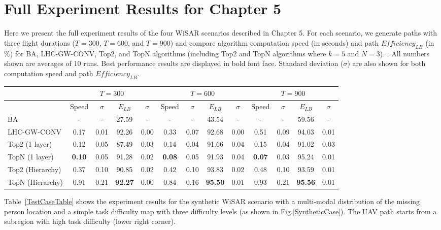 \chapter{Full Experiment Results for Chapter 5}
\label{chap:result}

Here we present the full experiment results of the four WiSAR scenarios described in Chapter 5. For each scenario, we generate paths with three flight durations ($T=300$, $T=600$, and $T=900$) and compare algorithm computation speed (in seconds) and path $\mathit{Efficiency_{LB}}$ (in \%) for BA, LHC-GW-CONV, Top2, and TopN algorithms (including Top2 and TopN algorithms where $k=5$ and $N=3$). . All numbers shown are averages of 10 runs. Best performance results are displayed in bold font face. Standard deviation ($\sigma$) are also shown for both computation speed and path $\mathit{Efficiency_{LB}}$.

\begin{center}
\begin{table*}
{
\scriptsize
\hfill{}
\setlength{\extrarowheight}{1.5pt}
\begin{tabular}
{|l|c|c|c|c|c|c|c|c|c|c|c|c|}
\hline
& \multicolumn{4}{|c|}{$T=300$} & \multicolumn{4}{|c|}{$T=600$} & \multicolumn{4}{|c|}{$T=900$} \\ 
\hline
& Speed & $\sigma$ & $\mathit{E_{LB}}$ & $\sigma$ & Speed & $\sigma$ & $\mathit{E_{LB}}$ & $\sigma$ & Speed & $\sigma$ & $\mathit{E_{LB}}$ & $\sigma$\\ 
\hline
BA & - & - & 27.59 & - & - & - & 43.54 & - & - & - & 59.56 & - \\ 
\hline
LHC-GW-CONV & 0.17 & 0.01 & 92.26 & 0.00 & 0.33 & 0.07 & 92.68 & 0.00 & 0.51 & 0.09 & 94.03 & 0.01 \\ 
\hline
Top2 (1 layer) & 0.12 & 0.05 & 87.49 & 0.03 & 0.14 & 0.04 & 91.66 & 0.04 & 0.15 & 0.04 & 91.02 & 0.03 \\ 
\hline
TopN (1 layer) & \textbf{0.10} & 0.05 & 91.28 & 0.02 & \textbf{0.08} & 0.05 & 91.93 & 0.04 & \textbf{0.07} & 0.03 & 95.24 & 0.01 \\ 
\hline
Top2 (Hierarchy) & 0.37 & 0.10 & 90.85 & 0.02 & 0.42 & 0.10 & 93.83 & 0.02 & 0.48 & 0.10 & 93.59 & 0.01  \\ 
\hline
TopN (Hierarchy) & 0.91 & 0.21 & \textbf{92.27} & 0.00 & 0.84 & 0.16 & \textbf{95.50} & 0.01 & 0.93 & 0.21 & \textbf{95.56} & 0.01 \\ 
\hline
\end{tabular}}
\medskip
\caption{Algorithms speed and $\mathit{Efficiency_{LB}}$ comparison for the multi-modal synthetic scenario.}
\label{TestCaseTable}
\end{table*}
\end{center}
Table~\ref{TestCaseTable} shows the experiment results for the synthetic WiSAR scenario with a multi-modal distribution of the missing person location and a simple task difficulty map with three difficulty levels (as shown in Fig.\ref{SyntheticCase}). The UAV path starts from a subregion with high task difficulty (lower right corner).

